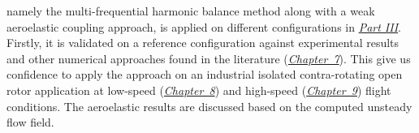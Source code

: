 \begin{itemize}
	namely the multi-frequential harmonic balance method along with a weak 
	aeroelastic coupling approach, is applied on different configurations
	in \hyperref[part3]{\emph{Part III}}. Firstly, it is validated 
	on a reference configuration against experimental 
	results and other numerical approaches found in the literature
	(\hyperref[cha:stcf11]{\emph{Chapter~7}}). This give us confidence
	to apply the approach on an industrial isolated contra-rotating
	open rotor application at low-speed (\hyperref[cha:dream_ls_isolated]{\emph{Chapter~8}})
	and high-speed (\hyperref[cha:dream_hs_isolated]{\emph{Chapter~9}})
	flight conditions. The aeroelastic results are discussed based
	on the computed unsteady flow field.
\end{itemize}
